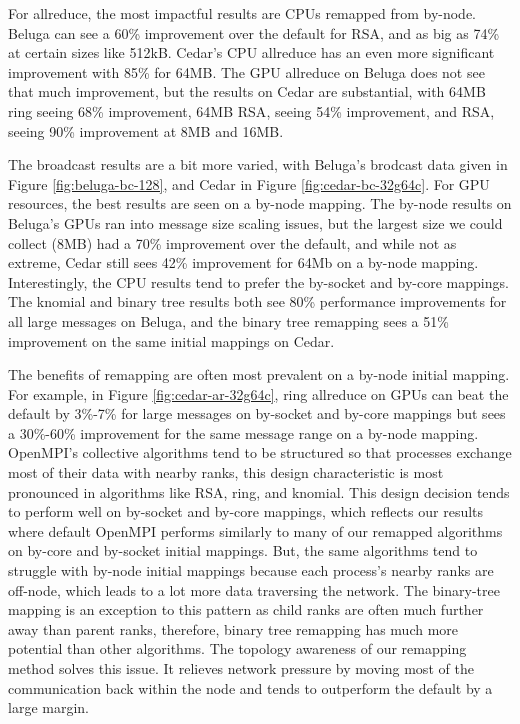 For allreduce, the most impactful results are \gls{CPU}s remapped from by-node.
Beluga can see a 60\% improvement over the default for \gls{RSA}, and as big as 74\% at certain sizes like 512kB.
Cedar's \gls{CPU} allreduce has an even more significant improvement with 85\% for 64MB.
The \gls{GPU} allreduce on Beluga does not see that much improvement, but the results on Cedar are substantial, with 64MB ring seeing 68\% improvement, 64MB \gls{RSA}, seeing 54\% improvement, and \gls{RSA}, seeing 90\% improvement at 8MB and 16MB.

The broadcast results are a bit more varied, with Beluga's brodcast data given in Figure \ref{fig:beluga-bc-128}, and Cedar in Figure \ref{fig:cedar-bc-32g64c}.
For \gls{GPU} resources, the best results are seen on a by-node mapping.
The by-node results on Beluga's \gls{GPU}s ran into message size scaling issues, but the largest size we could collect (8MB) had a 70\% improvement over the default, and while not as extreme, Cedar still sees 42\% improvement for 64Mb on a by-node mapping.
Interestingly, the \gls{CPU} results tend to prefer the by-socket and by-core mappings. 
The knomial and binary tree results both see 80\% performance improvements for all large messages on Beluga, and the binary tree remapping sees a 51\% improvement on the same initial mappings on Cedar.

The benefits of remapping are often most prevalent on a by-node initial mapping. 
For example, in Figure \ref{fig:cedar-ar-32g64c}, ring allreduce on \gls{GPU}s can beat the default by 3\%-7\% for large messages on by-socket and by-core mappings but sees a 30\%-60\% improvement for the same message range on a by-node mapping.
OpenMPI's collective algorithms tend to be structured so that processes exchange most of their data with nearby ranks, this design characteristic is most pronounced in algorithms like \gls{RSA}, ring, and knomial.
This design decision tends to perform well on by-socket and by-core mappings, which reflects our results where default OpenMPI performs similarly to many of our remapped algorithms on by-core and by-socket initial mappings.
But, the same algorithms tend to struggle with by-node initial mappings because each process's nearby ranks are off-node, which leads to a lot more data traversing the network.
The binary-tree mapping is an exception to this pattern as child ranks are often much further away than parent ranks, therefore, binary tree remapping has much more potential than other algorithms.
The topology awareness of our remapping method solves this issue. 
It relieves network pressure by moving most of the communication back within the node and tends to outperform the default by a large margin.

